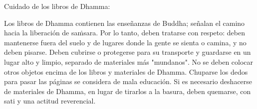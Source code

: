 
\thispagestyle{empty}

\newlength\ackWidth
\ifaivedition
\setlength{\ackWidth}{0.77\linewidth}
\else
\setlength{\ackWidth}{0.8\linewidth}
\fi

{\centering

\ifaivedition
\vspace*{9\baselineskip}
\else
\vspace*{6\baselineskip}
\fi

\begin{minipage}{\ackWidth}
\setlength{\parskip}{8pt}

{\instructionFont\color{instruction}Cuidado de los libros de Dhamma:}

\bigskip

Los libros de Dhamma contienen las enseñanzas de Buddha; señalan el camino hacia la liberación de saṁsara. Por lo tanto, deben tratarse con respeto: deben mantenerse fuera del suelo y de lugares donde la gente se sienta o camina, y no deben pisarse. Deben cubrirse o protegerse para su transporte y guardarse en un lugar alto y limpio, separado de materiales más "mundanos". No se deben colocar otros objetos encima de los libros y materiales de Dhamma. Chuparse los dedos para pasar las páginas se considera de mala educación. Si es necesario deshacerse de materiales de Dhamma, en lugar de tirarlos a la basura, deben quemarse, con sati y una actitud reverencial.

\end{minipage}

}

